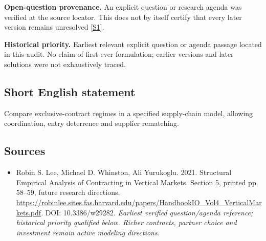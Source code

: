 \documentclass[11pt]{article}
\newcommand{\sref}[2]{\hyperlink{source:#1:#2}{[S#2]}}
\begin{document}
\par\textbf{Open-question provenance.} An explicit question or research agenda was verified at the source locator. This does not by itself certify that every later version remains unresolved \sref{30007681}{1}.

\par\textbf{Historical priority.} Earliest relevant explicit question or agenda passage located in this audit. No claim of first-ever formulation; earlier versions and later solutions were not exhaustively traced.

\subsection{Short English statement}
Compare exclusive-contract regimes in a specified supply-chain model, allowing coordination, entry deterrence and supplier rematching.

\subsection{Sources}
\begin{itemize}\raggedright
\item[\textnormal{[S1]}]\hypertarget{source:30007681:1}{} Robin S. Lee, Michael D. Whinston, Ali Yurukoglu. 2021. Structural Empirical Analysis of Contracting in Vertical Markets. Section 5, printed pp. 58–59, future research directions.
\url{https://robinlee.sites.fas.harvard.edu/papers/HandbookIO_Vol4_VerticalMarkets.pdf}.
DOI: 10.3386/w29282.
{\small\textit{Earliest verified question/agenda reference; historical priority qualified below. Richer contracts, partner choice and investment remain active modeling directions.}}
\end{itemize}
\end{document}
